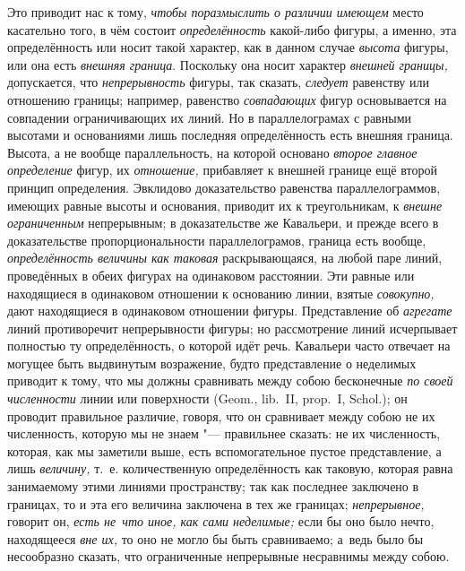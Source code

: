 Это приводит нас к тому, {\em чтобы поразмыслить о различии имеющем} место
касательно того, в чём состоит {\em определённость} какой-либо фигуры, а
именно, эта определённость или носит такой характер, как в данном случае
{\em высота} фигуры, или она есть {\em внешняя граница}. Поскольку она носит
характер {\em внешней границы,} допускается, что {\em непрерывность} фигуры,
так сказать, {\em следует} равенству или отношению границы; например, равенство
{\em совпадающих} фигур основывается на совпадении ограничивающих их линий. Но
в параллелограмах с равными высотами и основаниями лишь последняя
определённость есть внешняя граница. Высота, а не вообще параллельность, на
которой основано {\em второе главное определение} фигур, их {\em отношение,}
прибавляет к внешней границе ещё второй принцип определения. Эвклидово
доказательство равенства параллелограммов, имеющих равные высоты и основания,
приводит их к треугольникам, к {\em внешне ограниченным} непрерывным; в
доказательстве же Кавальери, и прежде всего в доказательстве пропорциональности
параллелограмов, граница есть вообще, {\em определённость величины как таковая}
раскрывающаяся, на любой паре линий, проведённых в обеих фигурах на одинаковом
расстоянии. Эти равные или находящиеся в одинаковом отношении к основанию
линии, взятые {\em совокупно,} дают находящиеся в одинаковом отношении фигуры.
Представление об {\em агрегате} линий противоречит непрерывности фигуры; но
рассмотрение линий исчерпывает полностью ту определённость, о которой идёт
речь. Кавальери часто отвечает на могущее быть выдвинутым возражение, будто
представление о неделимых приводит к тому, что мы должны сравнивать между собою
бесконечные {\em по своей численности} линии или поверхности (Geom., lib.~II,
prop.~I, Schol.); он проводит правильное различие, говоря, что он сравнивает
между собою не их численность, которую мы не знаем "--- правильнее сказать: не
их численность, которая, как мы заметили выше, есть вспомогательное пустое
представление, а лишь {\em величину,} т.~е. количественную определённость как
таковую, которая равна занимаемому этими линиями пространству; так как
последнее заключено в границах, то и эта его величина заключена в тех же
границах; {\em непрерывное,} говорит он, {\em есть не~что иное, как сами
неделимые;} если бы оно было нечто, находящееся {\em вне их,} то оно не могло
бы быть сравниваемо; а~ведь было бы несообразно сказать, что ограниченные
непрерывные несравнимы между собою.

